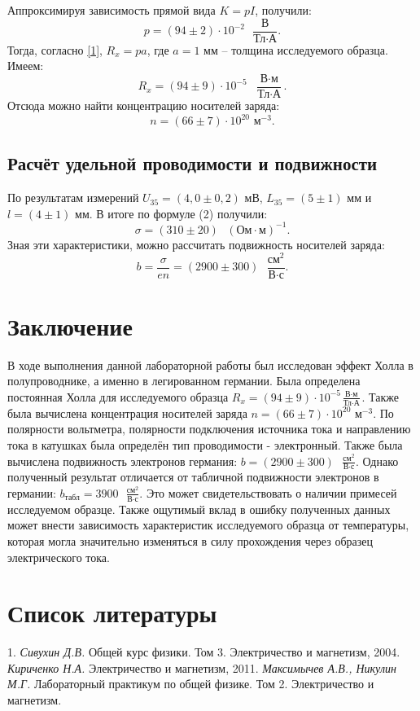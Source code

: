 \begin{table}[H]
	\centering
\end{table}
\n
Аппроксимируя зависимость прямой вида $ K=pI $, получили:
\[p = (94\pm2) \cdot 10^{-2} \text{ } \frac{\text{В}}{\text{Тл}\cdot\text{А}}.\]
\n
Тогда, согласно \eqref{1}, $ R_x = pa $, где $ a = 1 $ мм -- толщина исследуемого образца. Имеем:
\[R_x = (94\pm9) \cdot 10^{-5} \text{ } \frac{\text{В}\cdot\text{м}}{\text{Тл}\cdot\text{А}}.\]
\n
Отсюда можно найти концентрацию носителей заряда:
\[n = (66\pm7) \cdot 10^{20} \text{ м}^{-3}.\]

\subsection*{Расчёт удельной проводимости и подвижности}

По результатам измерений $ U_{35} = (4,0 \pm 0,2) $ мВ, $ L_{35} = (5 \pm 1) $ мм и $ l = (4 \pm 1) $ мм. В итоге по формуле (2) получили:
\[\sigma = (310\pm20)\text{ } (\text{Ом}\cdot\text{м})^{-1}.\]
\n
Зная эти характеристики, можно рассчитать подвижность носителей заряда:
\[b=\frac{\sigma}{en} = (2900\pm300) \text{ } \frac{\text{см}^2}{\text{В}\cdot\text{с}}.\]

\section*{Заключение}

В ходе выполнения данной лабораторной работы был исследован эффект Холла в полупроводнике, а именно в легированном германии. Была определена постоянная Холла для исследуемого образца $ R_x = (94\pm9) \cdot 10^{-5} \frac{\text{В}\cdot\text{м}}{\text{Тл}\cdot\text{А}} $. Также была вычислена концентрация носителей заряда $ n = (66\pm7) \cdot 10^{20} \text{ м}^{-3}. $
\n\n
По полярности вольтметра, полярности подключения источника тока и направлению тока в катушках была определён тип проводимости - электронный.
\n\n
Также была вычислена подвижность электронов германия: $ b = (2900\pm300) \text{ } \frac{\text{см}^2}{\text{В}\cdot\text{с}} $. Однако полученный результат отличается от табличной подвижности электронов в германии: $ b_{\text{табл}} = 3900 \text{ } \frac{\text{см}^2}{\text{В}\cdot\text{с}} $. Это может свидетельствовать о наличии примесей исследуемом образце.
\n\n
Также ощутимый вклад в ошибку полученных данных может внести зависимость характеристик исследуемого образца от температуры, которая могла значительно изменяться в силу прохождения через образец электрического тока.

\section*{Список литературы}
1. \textit{Сивухин Д.В.} Общей курс физики. Том 3. Электричество и магнетизм, 2004. \textit{Кириченко Н.А.} Электричество и магнетизм, 2011. \textit{Максимычев А.В., Никулин М.Г.} Лабораторный практикум по общей физике. Том 2. Электричество и магнетизм.

